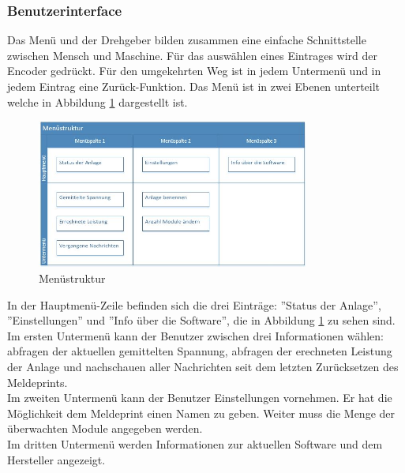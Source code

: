 \subsubsection{Benutzerinterface}
Das Menü und der Drehgeber bilden zusammen eine einfache Schnittstelle zwischen Mensch und Maschine. Für das auswählen eines Eintrages wird der Encoder gedrückt. Für den umgekehrten Weg ist in jedem Untermenü und in jedem Eintrag eine Zurück-Funktion. Das Menü ist in zwei Ebenen unterteilt welche in Abbildung \ref{fig:structure-menu} dargestellt ist.
\newpage
\begin{figure}[htbp] 
  \centering
     \includegraphics[width=0.8\textwidth]{graphics/structure-menu}
  \caption{Menüstruktur}
  \label{fig:structure-menu}
\end{figure}

In der Hauptmenü-Zeile befinden sich die drei Einträge: ''Status der Anlage'', ''Einstellungen'' und ''Info über die Software'', die in Abbildung \ref{fig:structure-menu} zu sehen sind.\\
Im ersten Untermenü kann der Benutzer zwischen drei Informationen wählen: abfragen der aktuellen gemittelten Spannung,  abfragen der erechneten Leistung der Anlage und nachschauen aller Nachrichten seit dem letzten Zurücksetzen des Meldeprints.\\
Im zweiten Untermenü kann der Benutzer Einstellungen vornehmen. Er hat die Möglichkeit dem Meldeprint einen Namen zu geben. Weiter muss die Menge der überwachten Module angegeben werden.\\
Im dritten Untermenü werden Informationen zur aktuellen Software und dem Hersteller angezeigt.\\